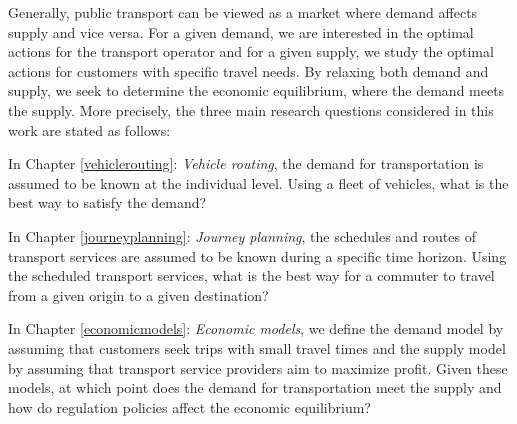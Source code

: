 \documentclass[dissertation,draft*]{aaltoseries}
\begin{document}
Generally, public transport can be viewed as a market where demand affects supply and vice versa.
For a given demand, we are interested in the optimal actions for the transport operator and for a given supply, 
we study the optimal actions for customers with specific travel needs. By relaxing both demand and supply, 
we seek to determine the economic equilibrium, where the demand meets the supply.
More precisely, the three main research questions considered in this work are stated as follows: 

In Chapter \ref{vehiclerouting}: \emph{Vehicle routing}, the demand for transportation is assumed to be known at the individual level. 
Using a fleet of vehicles, what is the best way to satisfy the demand? 

In Chapter \ref{journeyplanning}: \emph{Journey planning}, the schedules and routes of transport services are assumed to be known during a specific time horizon.
Using the scheduled transport services, what is the best way for a commuter to travel from a given origin to a given destination?

In Chapter \ref{economicmodels}: \emph{Economic models}, we define the demand model by assuming that customers seek trips with
small travel times and the supply model by assuming that transport service providers aim to maximize profit. Given these models,
at which point does the demand for transportation meet the supply and how do regulation policies affect the economic equilibrium?


\end{document}
